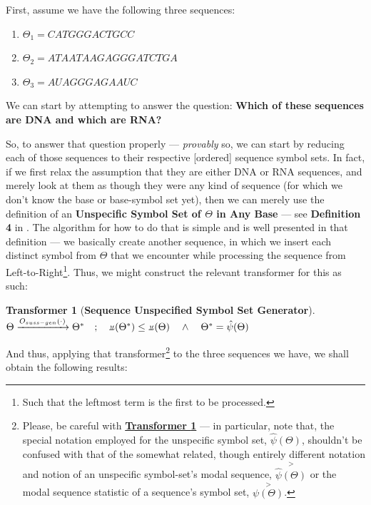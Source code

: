 \documentclass[a4paper, 18pt]{book} %
\newtheorem{transf}{Transformer}
\newcommand{\invpi}{\rotatebox[origin=c]{180}{$\pi$}}
\begin{document}
First, assume we have the following three sequences:

\begin{enumerate}
\item $\Theta_1 = CATGGGACTGCC$
\item $\Theta_2 = ATAATAAGAGGGATCTGA$
\item $\Theta_3 = AUAGGGAGAAUC$
\end{enumerate}

We can start by attempting to answer the question: \textbf{Which of these sequences are DNA and which are RNA?}

So, to answer that question properly --- \textit{provably} so, we can start by reducing each of those sequences to their respective [ordered] sequence symbol sets. In fact, if we first relax the assumption that they are either DNA or RNA sequences, and merely look at them as though they were any kind of sequence (for which we don't know the base or base-symbol set yet), then we can merely use the definition of an \textbf{Unspecific Symbol Set of $\Theta$ in Any Base} --- see \textbf{Definition 4} in \cite{ossipaper}. The algorithm for how to do that is simple and is well presented in that definition --- we basically create another sequence, in which we insert each distinct symbol from $\Theta$ that we encounter while processing the sequence from Left-to-Right\footnote{Such that the leftmost term is the first to be processed.}. Thus, we might construct the relevant transformer for this as such:\\

\begin{transf}[\textbf{Sequence Unspecified Symbol Set Generator}]
\label{TRANSSSGEN}$ $\\
$\Theta \xrightarrow{O_{suss-gen}(\cdot)} \Theta^* \quad;\quad \invpi(\Theta^*) \leq \invpi(\Theta) \quad \land \quad \Theta^* = \hat{\psi}(\Theta)$\\
\end{transf}

And thus, applying that transformer\footnote{Please, be careful with \textbf{\hyperref[TRANSSSGEN]{Transformer \ref{TRANSSSGEN}}} --- in particular, note that, the special notation employed for the unspecific symbol set, $\hat{\psi}(\Theta)$, shouldn't be confused with that of the somewhat related, though entirely different notation and notion of an unspecific symbol-set's modal sequence, $\overset{>}{\hat{\psi}(\Theta)}$ or the modal sequence statistic of a sequence's symbol set,  $\overset{>}{\psi(\Theta)}$.} to the three sequences we have, we shall obtain the following results:\\
\end{document}
